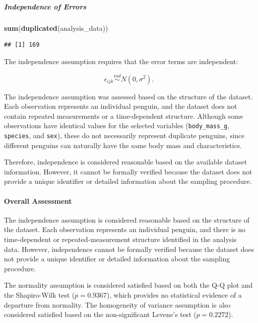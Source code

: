 \documentclass[
  11pt,
]{article}
\newenvironment{Shaded}{\begin{snugshade}}{\end{snugshade}}
\newcommand{\FunctionTok}[1]{\textcolor[rgb]{0.13,0.29,0.53}{\textbf{#1}}}
\newcommand{\NormalTok}[1]{#1}
\begin{document}
\subparagraph{Independence of Errors}\label{independence-of-errors}

\begin{Shaded}
\begin{Highlighting}[]
\FunctionTok{sum}\NormalTok{(}\FunctionTok{duplicated}\NormalTok{(analysis\_data))}
\end{Highlighting}
\end{Shaded}

\begin{verbatim}
## [1] 169
\end{verbatim}

The independence assumption requires that the error terms are
independent:

\[
\epsilon_{ijk} \overset{ind}{\sim} N(0,\sigma^2).
\]

The independence assumption was assessed based on the structure of the
dataset. Each observation represents an individual penguin, and the
dataset does not contain repeated measurements or a time-dependent
structure. Although some observations have identical values for the
selected variables (\texttt{body\_mass\_g}, \texttt{species}, and
\texttt{sex}), these do not necessarily represent duplicate penguins,
since different penguins can naturally have the same body mass and
characteristics.

Therefore, independence is considered reasonable based on the available
dataset information. However, it cannot be formally verified because the
dataset does not provide a unique identifier or detailed information
about the sampling procedure.

\paragraph{Overall Assessment}\label{overall-assessment}

The independence assumption is considered reasonable based on the
structure of the dataset. Each observation represents an individual
penguin, and there is no time-dependent or repeated-measurement
structure identified in the analysis data. However, independence cannot
be formally verified because the dataset does not provide a unique
identifier or detailed information about the sampling procedure.

The normality assumption is considered satisfied based on both the Q-Q
plot and the Shapiro-Wilk test (\(p=0.9367\)), which provides no
statistical evidence of a departure from normality. The homogeneity of
variance assumption is also considered satisfied based on the
non-significant Levene's test (\(p=0.2272\)).
\end{document}
